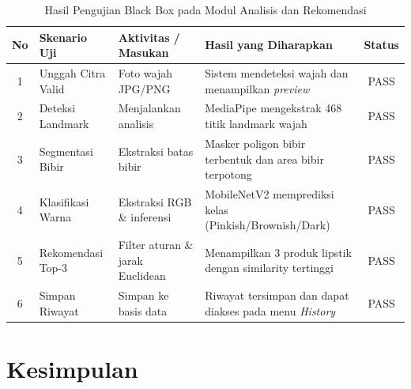 \documentclass[10pt,a4paper]{article}
\begin{document}
\begin{table}[htbp]
 \centering
 \caption{Hasil Pengujian Black Box pada Modul Analisis dan Rekomendasi}
 \label{tab:blackbox}
 \fontsize{8pt}{10pt}\selectfont
 \begin{tabularx}{\textwidth}{clXXc}
 \toprule
 \textbf{No} & \textbf{Skenario Uji} & \textbf{Aktivitas / Masukan} & \textbf{Hasil yang Diharapkan} & \textbf{Status} \\
 \midrule
 1 & Unggah Citra Valid & Foto wajah JPG/PNG & Sistem mendeteksi wajah dan menampilkan \textit{preview} & PASS \\
 2 & Deteksi Landmark & Menjalankan analisis & MediaPipe mengekstrak 468 titik landmark wajah & PASS \\
 3 & Segmentasi Bibir & Ekstraksi batas bibir & Masker poligon bibir terbentuk dan area bibir terpotong & PASS \\
 4 & Klasifikasi Warna & Ekstraksi RGB \& inferensi & MobileNetV2 memprediksi kelas (Pinkish/Brownish/Dark) & PASS \\
 5 & Rekomendasi Top-3 & Filter aturan \& jarak Euclidean & Menampilkan 3 produk lipstik dengan similarity tertinggi & PASS \\
 6 & Simpan Riwayat & Simpan ke basis data & Riwayat tersimpan dan dapat diakses pada menu \textit{History} & PASS \\
 \bottomrule
 \end{tabularx}
\end{table}

\FloatBarrier

\section{Kesimpulan }
\end{document}
